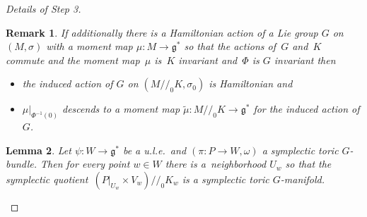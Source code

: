 \documentclass[pdftex]{sigma}
\numberwithin{equation}{section}
\newtheorem{Lemma}{Lemma}[section]
\newtheorem{Remark}[Lemma]{Remark}
\begin{document}
\begin{proof}[Details of Step 3]
\begin{Remark}\label{rmrk:2.28}
  If additionally there is a Hamiltonian action of a Lie group $G$ on
  $(M,\sigma)$ with a moment map $\mu\colon M\to {\mathfrak g}^*$ so that the actions
  of~$G$ and~$K$ commute and the moment map~$\mu$ is~$K$ invariant
  and~$\Phi$ is $G$ invariant then
\begin{itemize}\itemsep=0pt
\item the induced action of $G$ on $(M/\!/_0 K, \sigma_0)$ is
  Hamiltonian and
\item $\mu|_{\Phi^{-1} (0)}$ descends to a moment map
  $\tilde{\mu}\colon M/\!/_0 K \to {\mathfrak g}^*$ for the induced action of $G$.
\end{itemize}
\end{Remark}


\begin{Lemma}
  Let $\psi\colon W\to {\mathfrak g}^*$ be a u.l.e.\ and $(\pi\colon P\to W,\omega)$ a
  symplectic toric $G$-bundle.  Then for every point $w\in W$ there is a~neighborhood $U_w$ so that the symplectic quotient~$(P|_{U_w} \times
  V_w)/\!/_0 K_w$ is a symplectic toric
  $G$-manifold.
\end{Lemma}


\end{proof}
\end{document}
